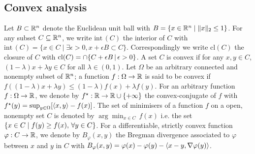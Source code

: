 \subsection*{Convex analysis}
Let $B\subset\mathbb R^{n}$ denote the Euclidean unit ball with $B=\{x\in\mathbb R^{n}\mid \|x\|_{2}\le 1\}$. For any subset $C\subseteq\mathbb R^{n}$, we write $\mathrm{int}\,(C)$ the interior of $C$ with $\mathrm{int}\,(C)=\{x\in C \mid \exists \epsilon>0, x+\epsilon B \subset C\}$. Correspondingly we write $\mathrm{cl}(C)$ the closure of $C$ with $\mathrm{cl}(C) = \cap\{C+\epsilon B\,|\, \epsilon>0\}$. A set $C$ is convex if for any $x,y\in C$, $(1-\lambda)x+\lambda y\in C$ for all $\lambda\in(0,1)$. Let $\Omega$ be an arbitrary connected and nonempty subset of $\mathbb R^{n}$; a function $f:\Omega\to\mathbb R$ is said to be convex if $f((1-\lambda)x+\lambda y)\le (1-\lambda)f(x)+\lambda f(y)$. For an arbitrary function $f:\Omega\to\mathbb R$, we denote by $f^{\star}:\mathbb R\to \mathbb R\cup\{+\infty\}$ the convex-conjugate of $f$ with $f^{\star}(y)=\sup_{y\in \Omega}[\left\langle x,y \right\rangle-f(x)]$. The set of minimisers of a function $f$ on a open, nonempty set $C$ is denoted by $\arg\min_{x\in C}\,f(x)$ i.e. the set $\left\{x\in C\mid f(y)\ge f(x), \,\forall y\in C\right\}$. For a differentiable, strictly convex function $\varphi:C\to\mathbb R$, we denote by $B_\varphi(x,y)$ the Bregman divergence associated to $\varphi$ between $x$ and $y$ in $C$ with $B_\varphi(x,y)=\varphi(x)-\varphi(y)-\left\langle x-y,\nabla \varphi(y) \right\rangle$.  

